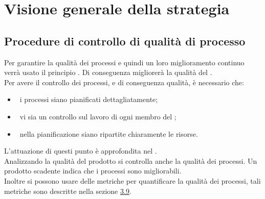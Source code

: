 
\section{Visione generale della strategia}

\subsection{Procedure di controllo di qualità di processo}
Per garantire la qualità dei processi e quindi un loro miglioramento continuo verrà usato il principio . Di conseguenza migliorerà la qualità del . \\
Per avere il controllo dei processi, e di conseguenza qualità, è necessario che:
\begin{itemize}
\item\ i processi siano pianificati dettagliatamente;
\item\ vi sia un controllo sul lavoro di ogni membro del ;
\item\ nella pianificazione siano ripartite chiaramente le risorse.
\end{itemize}
L'attuazione di questi punto è approfondita nel \PPdoc. \\
Analizzando la qualità del prodotto si controlla anche la qualità dei processi. Un prodotto scadente indica che i processi sono migliorabili. \\
Inoltre si possono usare delle metriche per quantificare la qualità dei processi, tali metriche sono descritte nella sezione \hyperref[sec:MisureGenerale]{3.9}.

\label{sec:MisureGenerale}
\label{sec:Misure}